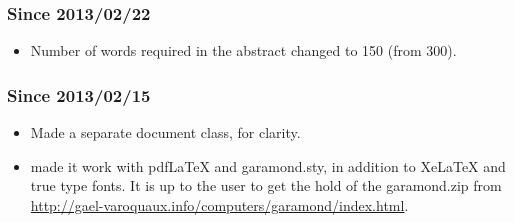 \documentclass{cslthse-msc}
\begin{document}
\begin{appendices}
\subsubsection{Since 2013/02/22}
\begin{itemize}
\item Number of words required in the abstract changed to 150 (from 300).
\end{itemize}

\subsubsection{Since 2013/02/15}
\begin{itemize}
\item Made a separate document class, for clarity.
\item made it work with pdfLaTeX and garamond.sty, in addition to XeLaTeX and true type fonts. It is up to the user to get the hold of the garamond.zip from \url{http://gael-varoquaux.info/computers/garamond/index.html}.
\end{itemize}
\end{appendices}

\fi
\end{document}
